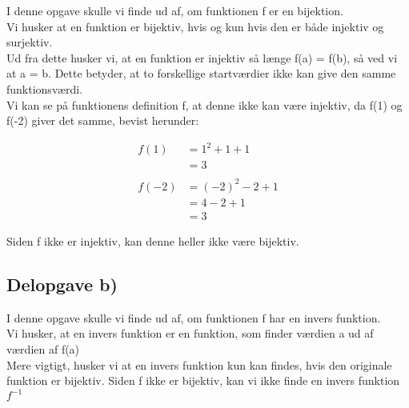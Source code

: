 \documentclass{article}
\begin{document}
I denne opgave skulle vi finde ud af, om funktionen f er en bijektion. \\
Vi husker at en funktion er bijektiv, hvis og kun hvis den er både injektiv og surjektiv. \\
Ud fra dette husker vi, at en funktion er injektiv så længe f(a) = f(b), så ved vi at a = b. Dette betyder, at to forskellige startværdier ikke kan give den samme funktionsværdi. \\

Vi kan se på funktionens definition f, at denne ikke kan være injektiv, da f(1) og f(-2) giver det samme, bevist herunder:

\begin{equation}
    \begin{aligned}
        f(1) & = 1^2 + 1 + 1 \\
        & = 3 \\ \\
        f(-2) &= (-2)^2 - 2 + 1 \\
        & = 4 - 2 + 1 \\
        & = 3
    \end{aligned}
\end{equation}

Siden f ikke er injektiv, kan denne heller ikke være bijektiv.

\subsection{Delopgave b)}

I denne opgave skulle vi finde ud af, om funktionen f har en invers funktion. \\
Vi husker, at en invers funktion er en funktion, som finder værdien a ud af værdien af f(a) \\
Mere vigtigt, husker vi at en invers funktion kun kan findes, hvis den originale funktion er bijektiv. Siden f ikke er bijektiv, kan vi ikke finde en invers funktion $f^{-1}$
\end{document}
